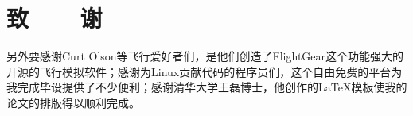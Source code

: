 

\renewcommand{\baselinestretch}{1.5}
\fontsize{12pt}{13pt}\selectfont

\chapter*{致~~~~谢}

另外要感谢Curt Olson等飞行爱好者们，是他们创造了FlightGear这个功能强大的开源的飞行模拟软件；感谢为Linux贡献代码的程序员们，这个自由免费的平台为我完成毕设提供了不少便利；感谢清华大学王磊博士，他创作的\LaTeX 模板使我的论文的排版得以顺利完成。
